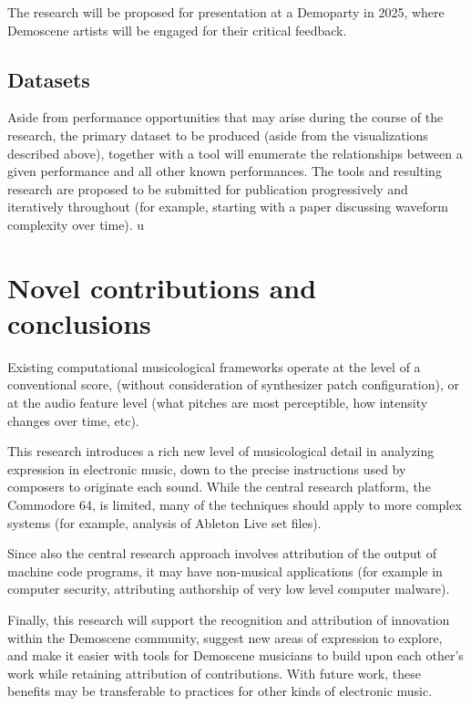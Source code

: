 \documentclass[10pt]{article}
\begin{document}
\begin{multicols*}{2}
  The research will be proposed for presentation at a Demoparty in 2025, where Demoscene artists will be engaged for their critical feedback.

  \subsection{Datasets}

Aside from performance opportunities that may arise during the course of the research, the primary dataset to be produced (aside from the visualizations described above), together with a tool will enumerate the relationships between a given performance and all other known performances.	The tools and resulting research are proposed to be submitted for publication progressively and iteratively throughout (for example, starting with a paper discussing waveform complexity over time). u

\section{Novel contributions and conclusions}

Existing computational musicological frameworks operate at the level of a conventional score, (without consideration of synthesizer patch configuration), or at the audio feature level (what pitches are most perceptible, how intensity changes over time, etc).

This research introduces a rich new level of musicological detail in analyzing expression in electronic music, down to the precise instructions used by composers to originate each sound. While the central research platform, the Commodore 64, is limited, many of the techniques should apply to more complex systems (for example, analysis of Ableton Live set files).

Since also the central research approach involves attribution of the output of machine code programs, it may have non-musical applications (for example in computer security, attributing authorship of very low level computer malware).

Finally, this research will support the recognition and attribution of innovation within the Demoscene community, suggest new areas of expression to explore, and make it easier with tools for Demoscene musicians to build upon each other’s work while retaining attribution of contributions. With future work, these benefits may be transferable to practices for other kinds of electronic music.


\clearpage


\end{multicols*}

\nocite{*}


\end{document}
